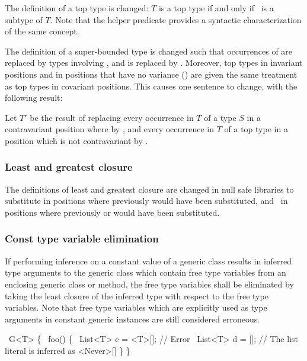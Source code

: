 \documentclass[makeidx]{article}
\begin{document}
{The definition of a top type is changed: $T$ is a top type if and only if
\ is a subtype of $T$. Note that the helper predicate \IsTopTypeName{}
provides a syntactic characterization of the same concept.

The definition of a super-bounded type is changed such that occurrences of
 are replaced by types involving , and  is replaced by
. Moreover, top types in invariant positions and in positions that
have no variance () are given the
same treatment as top types in covariant positions. This causes one
sentence to change, with the following result:

Let $T'$ be the result of replacing every occurrence in $T$ of a type $S$
in a contravariant position where  by , and every
occurrence in $T$ of a top type in a position which is not contravariant by
.

\subsubsection{Least and greatest closure}

The definitions of least and greatest closure are changed in null safe libraries
to substitute  in positions where previously  would have been
substituted, and \ in positions where previously  or \DYNAMIC{}
would have been substituted.

\subsubsection{Const type variable elimination}

If performing inference on a constant value of a generic class results in
inferred type arguments to the generic class which contain free type variables
from an enclosing generic class or method, the free type variables shall be
eliminated by taking the least closure of the inferred type with respect to the
free type variables.  Note that free type variables which are explicitly used as
type arguments in constant generic instances are still considered erroneous.

\begin{dartCode}
\CLASS\ G<T> \{
  \VOID\ foo() \{
    \CONST\ List<T> c = <T>[]; // Error
    \CONST\ List<T> d = []; // The list literal is inferred as <Never>[]
  \}
\}
\end{dartCode}

}
\end{document}
